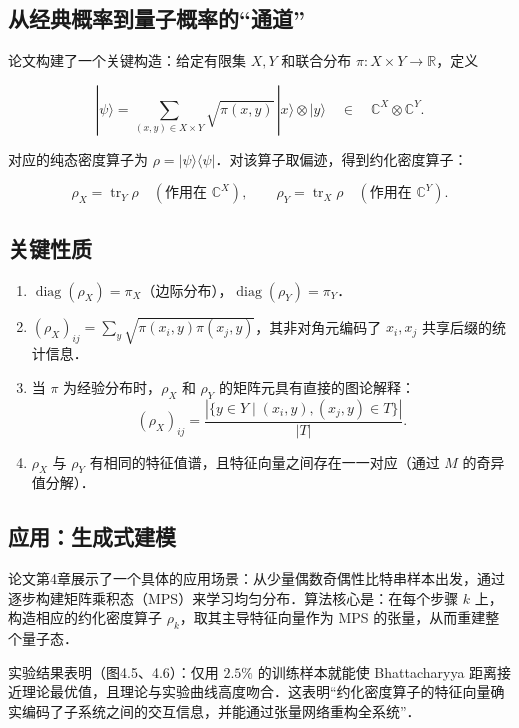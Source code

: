 \documentclass[10pt, openany]{book}
\begin{document}
\subsection{从经典概率到量子概率的“通道”}

论文构建了一个关键构造：给定有限集 $X, Y$ 和联合分布 $\pi: X \times Y \to \mathbb{R}$，定义

\[
|\psi\rangle = \sum_{(x,y) \in X \times Y} \sqrt{\pi(x,y)} \, |x\rangle \otimes |y\rangle \quad \in \quad \mathbb{C}^X \otimes \mathbb{C}^Y.
\]

对应的纯态密度算子为 $\rho = |\psi\rangle\langle\psi|$．对该算子取偏迹，得到约化密度算子：

\[
\rho_X = \operatorname{tr}_Y \rho \quad (\text{作用在 } \mathbb{C}^X), \qquad 
\rho_Y = \operatorname{tr}_X \rho \quad (\text{作用在 } \mathbb{C}^Y).
\]

\subsection{关键性质}

\begin{enumerate}
    \item $\operatorname{diag}(\rho_X) = \pi_X$（边际分布），$\operatorname{diag}(\rho_Y) = \pi_Y$．
    \item $(\rho_X)_{ij} = \sum_y \sqrt{\pi(x_i,y)\pi(x_j,y)}$，其非对角元编码了 $x_i, x_j$ 共享后缀的统计信息．
    \item 当 $\pi$ 为经验分布时，$\rho_X$ 和 $\rho_Y$ 的矩阵元具有直接的图论解释：
        \[
        (\rho_X)_{ij} = \frac{|\{y \in Y \mid (x_i,y), (x_j,y) \in T\}|}{|T|}.
        \]
    \item $\rho_X$ 与 $\rho_Y$ 有相同的特征值谱，且特征向量之间存在一一对应（通过 $M$ 的奇异值分解）．
\end{enumerate}


\subsection{应用：生成式建模}

论文第4章展示了一个具体的应用场景：从少量偶数奇偶性比特串样本出发，通过逐步构建矩阵乘积态（MPS）来学习均匀分布．算法核心是：在每个步骤 $k$ 上，构造相应的约化密度算子 $\rho_k$，取其主导特征向量作为 MPS 的张量，从而重建整个量子态．

实验结果表明（图4.5、4.6）：仅用 $2.5\%$ 的训练样本就能使 Bhattacharyya 距离接近理论最优值，且理论与实验曲线高度吻合．这表明“约化密度算子的特征向量确实编码了子系统之间的交互信息，并能通过张量网络重构全系统”．
\end{document}
